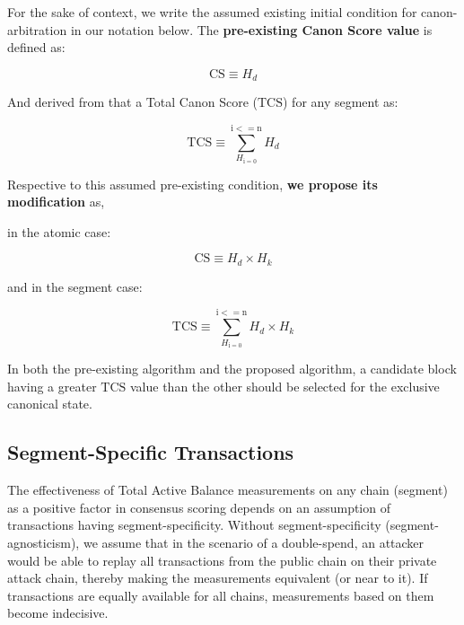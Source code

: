 \documentclass[11pt]{article}
\theoremstyle{plain}
\begin{document}
For the sake of context, we write the assumed existing initial condition for
canon-arbitration in our notation below. The \textbf{pre-existing Canon Score value} is defined as:

\begin{equation}
\mathrm{CS} \equiv H_d
\end{equation}

And derived from that a Total Canon Score ($\mathrm{TCS}$) for any segment as:

\begin{equation}
\mathrm{TCS} \equiv \sum_{H_\mathrm{i = 0}}^{\mathrm{i <= n}} H_d
\end{equation}

Respective to this assumed pre-existing condition, \textbf{we propose its modification} as,

in the atomic case:

\begin{equation}
\mathrm{CS} \equiv H_d \times H_k
\end{equation}

and in the segment case:

\begin{equation}
\mathrm{TCS} \equiv \sum_{H_\mathrm{i = 0}}^{\mathrm{i <= n}} H_d \times H_k
\end{equation}

In both the pre-existing algorithm and the proposed algorithm, a candidate
block having a greater $\mathrm{TCS}$ value than the other should be selected for
the exclusive canonical state.


\subsection{\small{Segment-Specific Transactions}}\label{subsec:small{segment-specific-transactions}}

The effectiveness of Total Active Balance measurements on any chain (segment)
as a positive factor in consensus scoring depends on an assumption of transactions having
segment-specificity.
Without segment-specificity (segment-agnosticism), we assume that in the scenario of a double-spend,
an attacker would be able to replay all transactions from the public chain on their private
attack chain, thereby making the measurements equivalent (or near to it).
If transactions are equally available for all chains, measurements based on them become indecisive.
\end{document}
